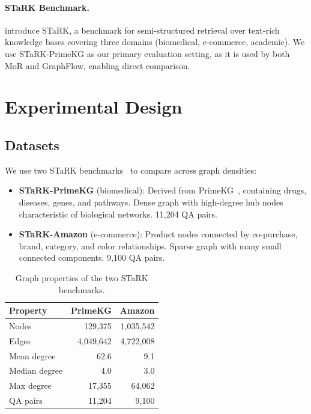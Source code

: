 \documentclass[11pt]{article}
\begin{document}
\paragraph{STaRK Benchmark.} \citet{wu2024stark} introduce STaRK, a benchmark for semi-structured retrieval over text-rich knowledge bases covering three domains (biomedical, e-commerce, academic). We use STaRK-PrimeKG as our primary evaluation setting, as it is used by both MoR and GraphFlow, enabling direct comparison.

\section{Experimental Design}

\subsection{Datasets}

We use two STaRK benchmarks~\citep{wu2024stark} to compare across graph densities:

\begin{itemize}
    \item \textbf{STaRK-PrimeKG} (biomedical): Derived from PrimeKG~\citep{chandak2023primekg}, containing drugs, diseases, genes, and pathways. Dense graph with high-degree hub nodes characteristic of biological networks. 11,204 QA pairs.
    \item \textbf{STaRK-Amazon} (e-commerce): Product nodes connected by co-purchase, brand, category, and color relationships. Sparse graph with many small connected components. 9,100 QA pairs.
\end{itemize}

\begin{table}[h]
\centering
\caption{Graph properties of the two STaRK benchmarks.}
\label{tab:graph_stats}
\begin{tabular}{lrr}
\toprule
Property & PrimeKG & Amazon \\
\midrule
Nodes & 129,375 & 1,035,542 \\
Edges & 4,049,642 & 4,722,008 \\
Mean degree & 62.6 & 9.1 \\
Median degree & 4.0 & 3.0 \\
Max degree & 17,355 & 64,062 \\
QA pairs & 11,204 & 9,100 \\
\bottomrule
\end{tabular}
\end{table}
\end{document}
